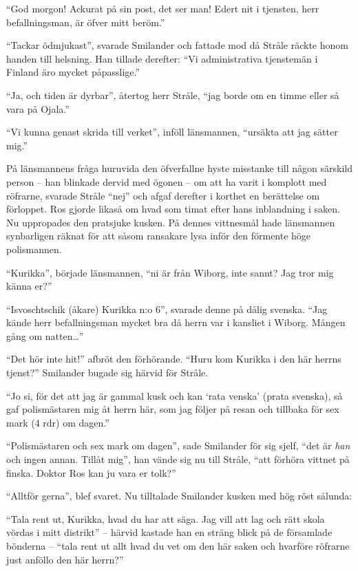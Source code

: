 ``God morgon! Ackurat på sin post, det ser man! Edert nit i tjensten,
herr befallningsman, är öfver mitt beröm.''

``Tackar ödmjukast'', svarade Smilander och fattade mod då Stråle räckte
honom handen till helsning. Han tillade derefter: ``Vi administrativa
tjenstemän i Finland äro mycket påpasslige.''

``Ja, och tiden är dyrbar'', återtog herr Stråle, ``jag borde om en
timme eller så vara på Ojala.''

``Vi kunna genast skrida till verket'', inföll länsmannen, ``ursäkta att
jag sätter mig.''

På länsmannens fråga huruvida den öfverfallne hyste misstanke till någon
särskild person -- han blinkade dervid med ögonen -- om att ha varit i
komplott med röfrarne, svarade Stråle ``nej'' och afgaf derefter i
korthet en berättelse om förloppet. Ros gjorde likaså om hvad som timat
efter hans inblandning i saken. Nu uppropades den pratsjuke kusken. På
dennes vittnesmål hade länsmannen synbarligen räknat för att såsom
ransakare lysa inför den förmente höge polismannen.

``Kurikka'', började länsmannen, ``ni är från Wiborg, inte sannt? Jag
tror mig känna er?''

``Isvoschtschik (åkare) Kurikka n:o 6'', svarade denne på dålig svenska.
``Jag kände herr befallningsman mycket bra då herrn var i kansliet i
Wiborg. Mången gång om natten\ldots{}''

``Det hör inte hit!'' afbröt den förhörande. ``Huru kom Kurikka i den
här herrns tjenst?'' Smilander bugade sig härvid för Stråle.

``Jo si, för det att jag är gammal kusk och kan `rata venska' (prata
svenska), så gaf polismästaren mig åt herrn här, som jag följer på resan
och tillbaka för sex mark (4 rdr) om dagen.''

``Polismästaren och sex mark om dagen'', sade Smilander för sig sjelf,
``det är \emph{han} och ingen annan. Tillåt mig'', han vände sig nu till
Stråle, ``att förhöra vittnet på finska. Doktor Ros kan ju vara er
tolk?''

``Alltför gerna'', blef svaret. Nu tilltalade Smilander kusken med hög
röst sålunda:

``Tala rent ut, Kurikka, hvad du har att säga. Jag vill att lag och rätt
skola vördas i mitt distrikt'' -- härvid kastade han en sträng blick på
de församlade bönderna -- ``tala rent ut allt hvad du vet om den här
saken och hvarföre röfrarne just anföllo den här herrn?''

